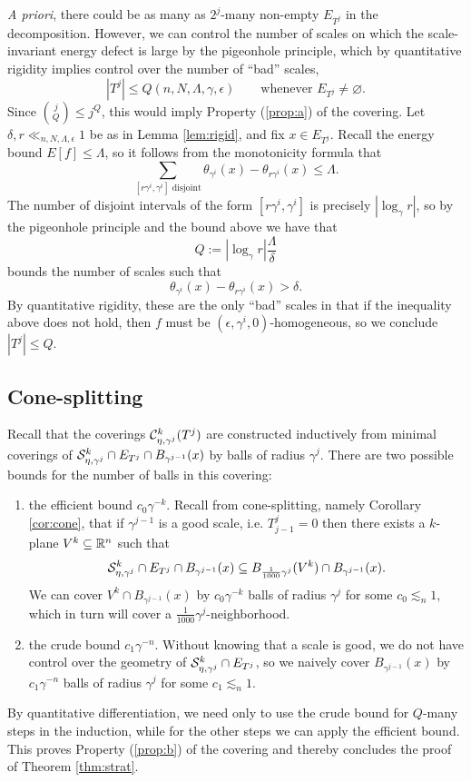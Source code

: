 \textit{A priori}, there could be as many as $2^j$-many non-empty $E_{T^j}$ in the decomposition. However, we can control the number of scales on which the scale-invariant energy defect is large by the pigeonhole principle, which by quantitative rigidity implies control over the number of ``bad'' scales, 
	\[ |T^j| \leq Q(n, N, \Lambda, \gamma, \epsilon) \qquad \text{whenever } E_{T^j} \neq \varnothing.\]
Since $\binom{j}{Q} \leq j^Q$, this would imply Property (\ref{prop:a}) of the covering. Let $\delta, r \ll_{n, N, \Lambda, \epsilon} 1$ be as in Lemma \ref{lem:rigid}, and fix $x \in E_{T^j}$. Recall the energy bound $E[f] \leq \Lambda$, so it follows from the monotonicity formula that
	\[ \sum_{[r\gamma^i, \gamma^i] \text{ disjoint}} \theta_{\gamma^i} (x) - \theta_{r\gamma^i} (x) \leq \Lambda. \]
The number of disjoint intervals of the form $[r \gamma^i, \gamma^i]$ is precisely $|\log_\gamma r|$, so by the pigeonhole principle and the bound above we have that
	\[  Q := |\log_\gamma r| \frac{\Lambda}{\delta}\]
bounds the number of scales such that
	\[ \theta_{\gamma^i} (x) - \theta_{r\gamma^i} (x) > \delta. \] 
By quantitative rigidity, these are the only ``bad'' scales in that if the inequality above does not hold, then $f$ must be $(\epsilon, \gamma^i, 0)$-homogeneous, so we conclude $|T^j| \leq Q$. 


\subsection{Cone-splitting}

Recall that the coverings $\mathcal C^k_{\eta, \gamma^j} (T^j)$ are constructed inductively from minimal coverings of $\mathcal S^k_{\eta, \gamma^j} \cap E_{T^j} \cap B_{\gamma^{j - 1}} (x)$ by balls of radius $\gamma^j$. There are two possible bounds for the number of balls in this covering:

\begin{enumerate}
	\item the efficient bound $c_0 \gamma^{-k}$. Recall from cone-splitting, namely Corollary \ref{cor:cone}, that if $\gamma^{j - 1}$ is a good scale, i.e. $T^j_{j - 1} = 0$ then there exists a $k$-plane $V^k \subseteq \mathbb R^n$ such that
		\[ \mathcal S^k_{\eta, \gamma^j} \cap E_{T^j} \cap B_{\gamma^{j - 1}}(x) \subseteq B_{\frac{1}{1000} \gamma^j} (V^k) \cap  B_{\gamma^{j - 1}}(x). \]
		We can cover $V^k \cap B_{\gamma^{j - 1}} (x)$ by $c_0 \gamma^{-k}$ balls of radius $\gamma^j$ for some $c_0 \lesssim_n 1$, which in turn will cover a $\tfrac{1}{1000} \gamma^j$-neighborhood.
	
	\item the crude bound $c_1\gamma^{-n}$. Without knowing that a scale is good, we do not have control over the geometry of $\mathcal S^k_{\eta, \gamma^j} \cap E_{T^j}$, so we naively cover $B_{\gamma^{j - 1}} (x)$ by $c_1 \gamma^{-n}$ balls of radius $\gamma^j$ for some $c_1 \lesssim_n 1$.
\end{enumerate}
By quantitative differentiation, we need only to use the crude bound for $Q$-many steps in the induction, while for the other steps we can apply the efficient bound. This proves Property (\ref{prop:b}) of the covering and thereby concludes the proof of Theorem \ref{thm:strat}.


